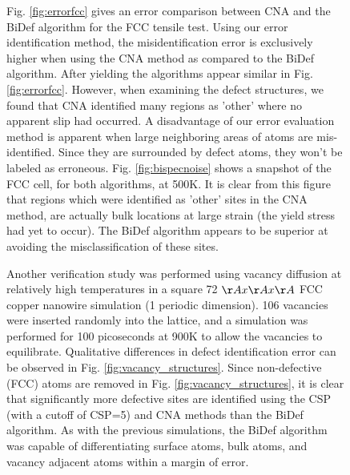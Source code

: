 \documentclass[12pt]{iopart}
\begin{document}
\begin{figure}[htbp]
Fig. \ref{fig:errorfcc} gives an error comparison between CNA and the BiDef algorithm for the FCC tensile test. Using our error identification method, the misidentification error is exclusively higher when using the CNA method as compared to the BiDef algorithm. After yielding the algorithms appear similar in Fig. \ref{fig:errorfcc}. However, when examining the defect structures, we found that CNA identified many regions as 'other' where no apparent slip had occurred. A disadvantage of our error evaluation method is apparent when large neighboring areas of atoms are mis-identified. Since they are surrounded by defect atoms, they won't be labeled as erroneous. Fig. \ref{fig:bispecnoise} shows a snapshot of the FCC cell, for both algorithms, at 500K. It is clear from this figure that regions which were identified as 'other' sites in the CNA method, are actually bulk locations at large strain (the yield stress had yet to occur). The BiDef algorithm appears to be superior at avoiding the misclassification of these sites.

Another verification study was performed using vacancy diffusion at relatively high temperatures in a square 72 $\AA x \AA  x \AA$ FCC copper nanowire simulation (1 periodic dimension). 106 vacancies were inserted randomly into the lattice, and a simulation was performed for 100 picoseconds at 900K to allow the vacancies to equilibrate. Qualitative differences in defect identification error can be observed in Fig. \ref{fig:vacancy_structures}. Since non-defective (FCC) atoms are removed in Fig. \ref{fig:vacancy_structures}, it is clear that significantly more defective sites are identified using the CSP (with a cutoff of CSP=5) and CNA methods than the BiDef algorithm. As with the previous simulations, the BiDef algorithm was capable of differentiating surface atoms, bulk atoms, and vacancy adjacent atoms within a margin of error.


\end{figure}
\end{document}
